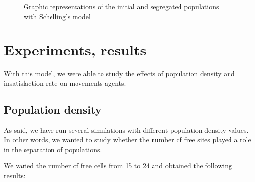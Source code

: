 \documentclass[a4paper, 12pt]{report}
\begin{document}
\begin{figure}[ht]

	\centering
	\centering
	\caption{Graphic representations of the initial and segregated populations with Schelling's model}

\end{figure}

\newpage

\section{Experiments, results}

With this model, we were able to study the effects of population density and insatisfaction rate on movements
agents.

\subsection{Population density}

As said, we have run several simulations with different population density values. In other words,
we wanted to study whether the number of free sites played a role in the separation of populations.

\vspace{0.7cm}

We varied the number of free cells from 15 to 24 and obtained the following results:
\end{document}
